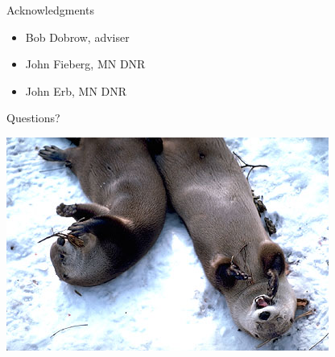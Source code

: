 \documentclass{beamer}
\begin{document}
\begin{frame}{Acknowledgments}
	\begin{itemize}
		\item Bob Dobrow, adviser
		\item John Fieberg, MN DNR
		\item John Erb, MN DNR
	\end{itemize}
	\begin{center}
	\end{center}
\end{frame}

\begin{frame}{Questions?}
	\begin{center}
	\includegraphics[scale=0.7]{cuteOtter7.jpg}
	\end{center}
\end{frame}
\end{document}
